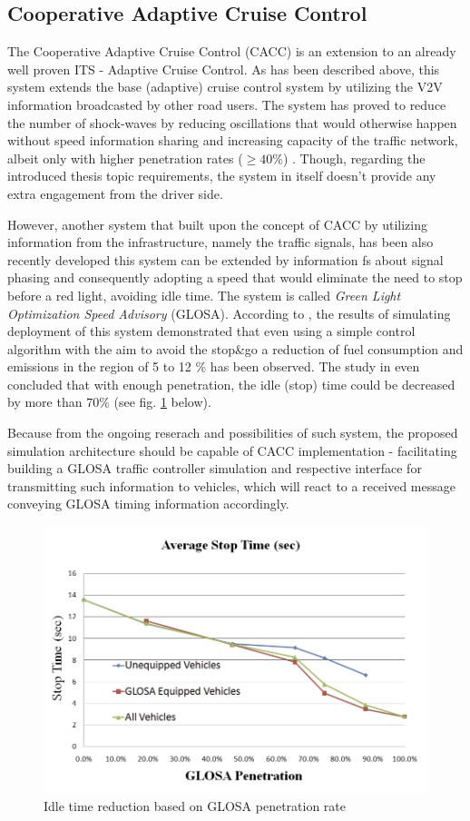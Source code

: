 \documentclass[main.tex]{subfiles}
\begin{document}
\subsection{Cooperative Adaptive Cruise Control}

The Cooperative Adaptive Cruise Control (CACC) is an extension to an already well proven ITS -
Adaptive Cruise Control.  As has been described above, this system extends the base (adaptive)
cruise control system by utilizing the V2V information broadcasted by other road users. The
system has proved to reduce the number of shock-waves by reducing oscillations that would
otherwise happen without speed information sharing and increasing capacity of the traffic
network, albeit only with higher penetration rates ($\ge 40\%$) \cite{van_Arem_2006}. Though,
regarding the introduced thesis topic requirements, the system in itself doesn't provide any
extra engagement from the driver side. 

However, another system that built upon the concept of CACC by utilizing information from the
infrastructure, namely the traffic signals, has been also recently developed this system can be
extended by information fs about signal phasing and consequently adopting a speed that would
eliminate the need to stop before a red light, avoiding idle time. The system is called
\emph{Green Light Optimization Speed Advisory} (GLOSA). According to \cite{Pariota_2019}, the results 
of simulating deployment of this system demonstrated that even using a simple
control algorithm with the aim to avoid the stop\&go a reduction of fuel consumption
and emissions in the region of 5 to 12 \% has been observed. The study in \cite{Katsaros_2011} even 
concluded that with enough penetration, the idle (stop) time could be decreased by more than $70 \%$ 
(see fig. \ref{glosa-chart} below).

Because from the ongoing reserach and possibilities of such system, the proposed simulation architecture 
should be capable of CACC implementation - facilitating building a GLOSA traffic controller simulation
and respective interface for transmitting such information to vehicles, which will react to a received 
message conveying GLOSA timing information accordingly. 

\begin{figure}[htbp]
    \centering
    \includegraphics[width=.8\textwidth]{glosa-perf-chart.png} 
    \caption{Idle time reduction based on GLOSA penetration rate \cite{Katsaros_2011}}
    \label{glosa-chart}
\end{figure}
\end{document}
